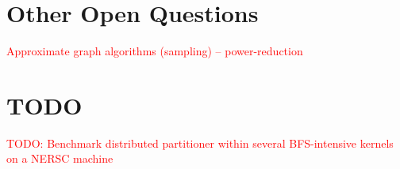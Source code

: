 \documentclass[11pt]{article}
\newcommand\warning[1]{\textcolor{red}{#1}}
\begin{document}

\newpage \section{Other Open Questions}

\warning{Approximate graph algorithms (sampling) -- power-reduction}


\newpage \section{TODO}
\warning{TODO: Benchmark distributed partitioner within several BFS-intensive kernels on a NERSC machine}




\end{document}
